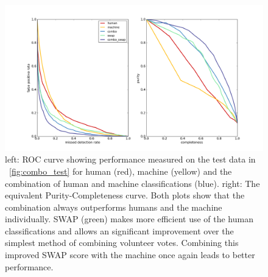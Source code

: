 \documentclass[a4paper,fleqn,usenatbib]{mnras}
\begin{document}
\begin{figure}
   \begin{minipage}{160mm}
   \includegraphics[trim=40mm 10mm 40mm 20mm,clip,width=160mm]{figs/combo_swap_roc.png}
   \caption{left: ROC curve showing performance measured on the test data in ~\ref{fig:combo_test} for human (red), machine (yellow) and
            the combination of human and machine classifications (blue).  right: The equivalent Purity-Completeness curve.  Both
            plots show that the combination always outperforms humans and the machine individually.  SWAP (green) makes more efficient use of the human classifications and allows an significant improvement over the simplest method of combining volunteer votes.  Combining this improved SWAP score with the machine once again leads to better performance.} 
   \label{fig:roc} 
   \end{minipage}
\end{figure}

\end{document}
